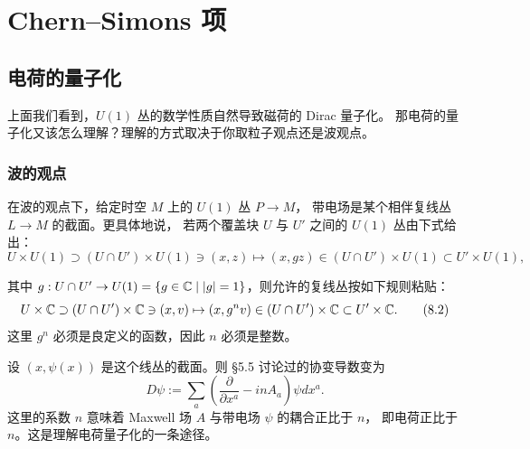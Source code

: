 
\chapter{Chern--Simons 项}

\section{电荷的量子化}

上面我们看到，$U(1)$ 丛的数学性质自然导致磁荷的 Dirac 量子化。
那电荷的量子化又该怎么理解？理解的方式取决于你取粒子观点还是波观点。

\subsection{波的观点}

在波的观点下，给定时空 $M$ 上的 $U(1)$ 丛 $P\to M$，
带电场是某个相伴复线丛 $L\to M$ 的截面。更具体地说，
若两个覆盖块 $U$ 与 $U'$ 之间的 $U(1)$ 丛由下式给出：
\begin{equation}
U\times U(1)\supset(U\cap U')\times U(1)\ni(x,z)\mapsto(x,gz)
\in(U\cap U')\times U(1)\subset U'\times U(1),
\tag{8.1}
\end{equation}

其中 $g:U\cap U'\to U(1)=\{g\in\mathbb{C}\mid|g|=1\}$，则允许的复线丛按如下规则粘贴：
\begin{equation}
U\times\mathbb{C}\supset(U\cap U')\times\mathbb{C}\ni(x,v)\mapsto(x,g^nv)
\in(U\cap U')\times\mathbb{C}\subset U'\times\mathbb{C}.
\tag{8.2}
\end{equation}
这里 $g^n$ 必须是良定义的函数，因此 $n$ 必须是整数。

设 $(x,\psi(x))$ 是这个线丛的截面。则 §5.5 讨论过的协变导数变为
\begin{equation}
D\psi:=\sum_a\left(\frac{\partial}{\partial x^a}-inA_a\right)\psi dx^a.
\tag{8.3}
\end{equation}
这里的系数 $n$ 意味着 Maxwell 场 $A$ 与带电场 $\psi$ 的耦合正比于 $n$，
即电荷正比于 $n$。这是理解电荷量子化的一条途径。

